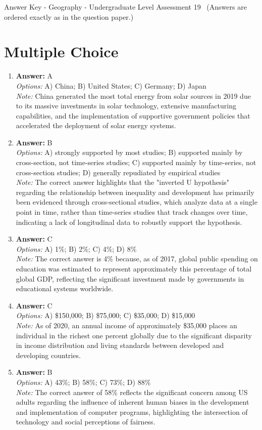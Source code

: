 \documentclass[12pt]{article}
\begin{document}
\begin{center}
Answer Key - Geography - Undergraduate Level Assessment 19 \
\small (Answers are ordered exactly as in the question paper.)
\end{center}

\section*{Multiple Choice}
\begin{enumerate}[label=\arabic*.]
\item \textbf{Answer:} A
\\ \textit{Options:} A) China; B) United States; C) Germany; D) Japan
\\ \textit{Note:} China generated the most total energy from solar sources in 2019 due to its massive investments in solar technology, extensive manufacturing capabilities, and the implementation of supportive government policies that accelerated the deployment of solar energy systems.
\item \textbf{Answer:} B
\\ \textit{Options:} A) strongly supported by most studies; B) supported mainly by cross-section, not time-series studies; C) supported mainly by time-series, not cross-section studies; D) generally repudiated by empirical studies
\\ \textit{Note:} The correct answer highlights that the "inverted U hypothesis" regarding the relationship between inequality and development has primarily been evidenced through cross-sectional studies, which analyze data at a single point in time, rather than time-series studies that track changes over time, indicating a lack of longitudinal data to robustly support the hypothesis.
\item \textbf{Answer:} C
\\ \textit{Options:} A) 1\%; B) 2\%; C) 4\%; D) 8\%
\\ \textit{Note:} The correct answer is 4\% because, as of 2017, global public spending on education was estimated to represent approximately this percentage of total global GDP, reflecting the significant investment made by governments in educational systems worldwide.
\item \textbf{Answer:} C
\\ \textit{Options:} A) \$150,000; B) \$75,000; C) \$35,000; D) \$15,000
\\ \textit{Note:} As of 2020, an annual income of approximately \$35,000 places an individual in the richest one percent globally due to the significant disparity in income distribution and living standards between developed and developing countries.
\item \textbf{Answer:} B
\\ \textit{Options:} A) 43\%; B) 58\%; C) 73\%; D) 88\%
\\ \textit{Note:} The correct answer of 58\% reflects the significant concern among US adults regarding the influence of inherent human biases in the development and implementation of computer programs, highlighting the intersection of technology and social perceptions of fairness.
\end{enumerate}
\end{document}
